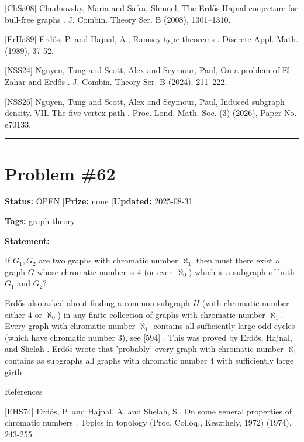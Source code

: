\documentclass{article}
\begin{document}
[ChSa08] Chudnovsky, Maria and Safra, Shmuel, The {E}rd\H os-{H}ajnal conjecture for bull-free graphs . J. Combin. Theory Ser. B (2008), 1301--1310.

[ErHa89] Erd\H{o}s, P. and Hajnal, A., Ramsey-type theorems . Discrete Appl. Math. (1989), 37-52.

[NSS24] Nguyen, Tung and Scott, Alex and Seymour, Paul, On a problem of {E}l-{Z}ahar and {E}rd\H{o}s . J. Combin. Theory Ser. B (2024), 211--222.

[NSS26] Nguyen, Tung and Scott, Alex and Seymour, Paul, Induced subgraph density. {VII}. The five-vertex path . Proc. Lond. Math. Soc. (3) (2026), Paper No. e70133.

\noindent\rule{\linewidth}{0.4pt}


\section{Problem \#62}
\label{prob:62}

\noindent\textbf{Status:} OPEN \quad|\quad \textbf{Prize:} none \quad|\quad \textbf{Updated:} 2025-08-31

\noindent\textbf{Tags:} graph theory

\medskip

\noindent\textbf{Statement:}

If $G_1,G_2$ are two graphs with chromatic number $\aleph_1$ then must there exist a graph $G$ whose chromatic number is $4$ (or even $\aleph_0$) which is a subgraph of both $G_1$ and $G_2$?




Erd\H{o}s also asked \cite{Er87} about finding a common subgraph $H$ (with chromatic number either $4$ or $\aleph_0$) in any finite collection of graphs with chromatic number $\aleph_1$. Every graph with chromatic number $\aleph_1$ contains all sufficiently large odd cycles (which have chromatic number $3$), see [594] . This was proved by Erd\H{o}s, Hajnal, and Shelah \cite{EHS74}. Erd\H{o}s wrote \cite{Er87} that 'probably' every graph with chromatic number $\aleph_1$ contains as subgraphs all graphs with chromatic number $4$ with sufficiently large girth.




References

[EHS74] Erd\H{o}s, P. and Hajnal, A. and Shelah, S., On some general properties of chromatic numbers . Topics in topology (Proc. Colloq., Keszthely, 1972) (1974), 243-255.
\end{document}
